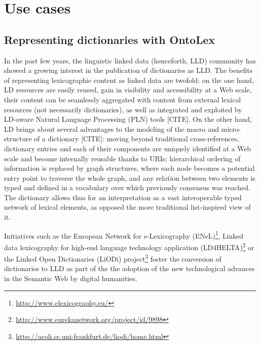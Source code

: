 \documentclass[12pt,a4paper]{elex2017}
\begin{document}
\section{Use cases}

\subsection{Representing dictionaries with OntoLex}


In the past few years, the linguistic linked data (henceforth, LLD) community 
has showed a growing interest in the publication of dictionaries as LLD. The 
benefits of representing lexicographic content as linked data are twofold: on 
the one hand, LD resources are easily reused, gain in visibility and 
accessibility at a Web scale, their content can be seamlessly aggregated with 
content from external lexical resources (not necessarily dictionaries), as well 
as integrated and exploited by LD-aware Natural Language Processing (PLN) tools 
[CITE]. On the other hand, LD brings about several advantages to the modeling of the
 macro and micro-structure of a dictionary [CITE]: moving beyond traditional 
 cross-references, dictionary entries and each of their components are uniquely 
 identified at a Web scale and become internally reusable thanks to URIs; 
 hierarchical ordering of information is replaced by graph structures, where 
 each node becomes a potential entry point to traverse the whole graph, and any 
 relation between two elements is typed and defined in a vocabulary over which 
 previously consensus was reached. The dictionary allows thus for an interpretation as a vast interoperable typed network of lexical elements, as opposed the more traditional list-inspired view of it. 

Initiatives such as the European Network for e-Lexicography (ENeL)\footnote{\url{http://www.elexicography.eu/}}, Linked data lexicography for 
high-end language technology application (LD4HELTA)\footnote{\url{http://www.eurekanetwork.org/project/id/9898}} or the Linked Open
 Dictionaries (LiODi) project\footnote{\url{http://acoli.cs.uni-frankfurt.de/liodi/home.html}} foster the 
 conversion of dictionaries to LLD as part of the the adoption of the new 
 technological advances in the Semantic Web by digital humanities. 
\end{document}
